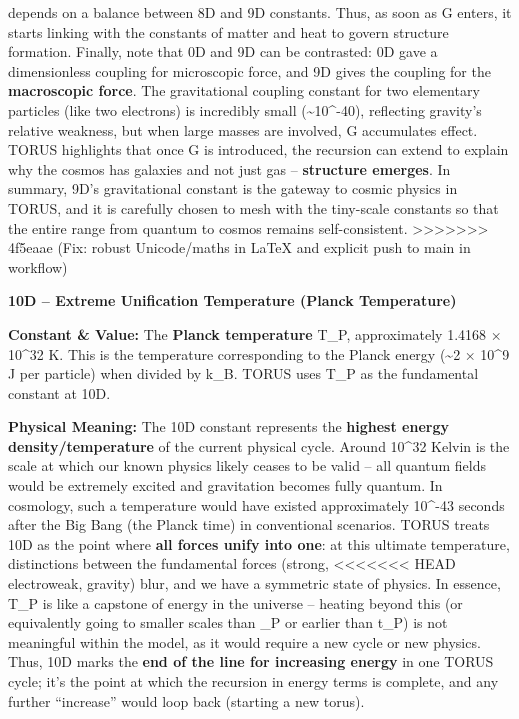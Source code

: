 \documentclass[]{article}
\begin{document}
depends on a balance between 8D and 9D constants. Thus, as soon as G
enters, it starts linking with the constants of matter and heat to
govern structure formation. Finally, note that 0D and 9D can be
contrasted: 0D gave a dimensionless coupling for microscopic force, and
9D gives the coupling for the \textbf{macroscopic force}. The
gravitational coupling constant for two elementary particles (like two
electrons) is incredibly small (\textasciitilde{}10\^{}-40), reflecting
gravity's relative weakness, but when large masses are involved, G
accumulates effect. TORUS highlights that once G is introduced, the
recursion can extend to explain why the cosmos has galaxies and not just
gas -- \textbf{structure emerges}. In summary, 9D's gravitational
constant is the gateway to cosmic physics in TORUS, and it is carefully
chosen to mesh with the tiny-scale constants so that the entire range
from quantum to cosmos remains self-consistent.
>>>>>>> 4f5eaae (Fix: robust Unicode/maths in LaTeX and explicit push to main in workflow)

\textbf{10D -- Extreme Unification Temperature (Planck Temperature)}

\textbf{Constant \& Value:} The \textbf{Planck temperature} T\_P,
approximately 1.4168 × 10\^{}32 K​. This is the temperature
corresponding to the Planck energy (\textasciitilde{}2 × 10\^{}9 J per
particle) when divided by k\_B. TORUS uses T\_P as the fundamental
constant at 10D.

\textbf{Physical Meaning:} The 10D constant represents the
\textbf{highest energy density/temperature} of the current physical
cycle. Around 10\^{}32 Kelvin is the scale at which our known physics
likely ceases to be valid -- all quantum fields would be extremely
excited and gravitation becomes fully quantum. In cosmology, such a
temperature would have existed approximately 10\^{}-43 seconds after the
Big Bang (the Planck time) in conventional scenarios. TORUS treats 10D
as the point where \textbf{all forces unify into one}: at this ultimate
temperature, distinctions between the fundamental forces (strong,
<<<<<<< HEAD
electroweak, gravity) blur, and we have a symmetric state of
physics\hspace{0pt}. In essence, T\_P is like a capstone of energy in
the universe -- heating beyond this (or equivalently going to smaller
scales than \ell\_P or earlier than t\_P) is not meaningful within the
model, as it would require a new cycle or new physics. Thus, 10D marks
the \textbf{end of the line for increasing energy} in one TORUS cycle;
it's the point at which the recursion in energy terms is complete, and
any further ``increase'' would loop back (starting a new torus).
\end{document}
